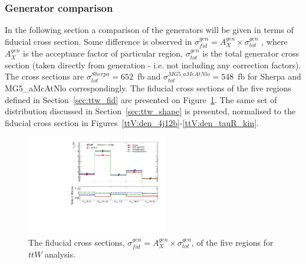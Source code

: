 %
%
%
%
%
\subsubsection{Generator comparison}
\label{sec:ttw_gen}

In the following section a comparison of the generators will be given in terms of fiducial cross section. Some difference is observed in $\sigma_{fid}^{gen}=A_X^{gen}\times \sigma_{tot}^{gen}$ , where $A_X^{gen}$ is the acceptance factor of particular region, $\sigma_{tot}^{gen}$ is the total generator cross section (taken directly from generation - i.e. not including any correction factors). The cross sections are $\sigma_{tot}^{Sherpa}=652$~fb and $\sigma_{tot}^{MG5\_aMcAtNlo}=548$~fb for Sherpa and MG5\_aMcAtNlo correspondingly. The fiducial cross sections of the five regions defined in Section~\ref{sec:ttw_fid} are presented on Figure~\ref{ttV:fid_xs}.
The same set of distribution discussed in Section~\ref{sec:ttw_shape} is presented, normalised to the fiducial cross section in Figures~\ref{ttV:den_4j12b}-\ref{ttV:den_tauR_kin}.

\begin{figure}[!htb]
\centering
\includegraphics[width=0.55\textwidth]{Plots/ttV/generator/acc_7f}
  \caption{The fiducial cross sections, $\sigma_{fid}^{gen}=A_X^{gen}\times \sigma_{tot}^{gen}$,  of the five regions for $ttW$ analysis. \label{ttV:fid_xs}}
\end{figure}


